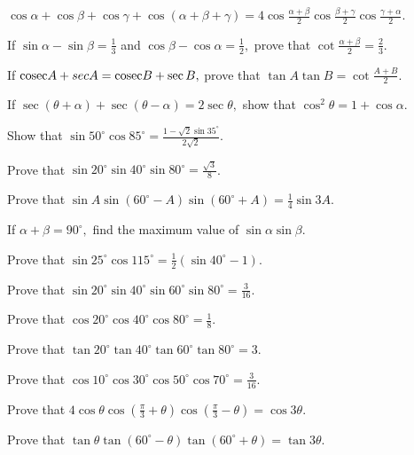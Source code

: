 \item $\cos\alpha + \cos\beta + \cos\gamma + \cos(\alpha + \beta + \gamma) = 4\cos\frac{\alpha + \beta}{2}\cos\frac{\beta +
    \gamma}{2}\cos \frac{\gamma + \alpha}{2}$.

\item If $\sin\alpha - \sin\beta = \frac{1}{3}$ and $\cos\beta - \cos\alpha = \frac{1}{2},$ prove that
    $\cot\frac{\alpha + \beta}{2} = \frac{2}{3}$.

\item If ${\rm cosec} A + sec A = {\rm cosec} B + \sec B,$ prove that $\tan A\tan B = \cot \frac{A + B}{2}$.

\item If $\sec(\theta + \alpha) + \sec(\theta - \alpha) = 2\sec\theta,$ show that $\cos^2\theta = 1 + \cos\alpha$.

\item Show that $\sin50^\circ\cos85^\circ = \frac{1 - \sqrt{2}\sin 35^\circ}{2\sqrt{2}}$.

\item Prove that $\sin 20^\circ \sin 40^\circ\sin 80^\circ = \frac{\sqrt{3}}{8}$.

\item Prove that $\sin A\sin(60^\circ - A)\sin(60^\circ + A) = \frac{1}{4}\sin 3A$.

\item If $\alpha + \beta = 90^\circ,$ find the maximum value of $\sin\alpha\sin\beta$.

\item Prove that $\sin 25^\circ\cos 115^\circ = \frac{1}{2}(\sin 40^\circ - 1)$.

\item Prove that $\sin 20^\circ \sin 40^\circ\sin 60^\circ \sin80^\circ = \frac{3}{16}$.

\item Prove that $\cos 20^\circ\cos40^\circ\cos80^\circ = \frac{1}{8}$.

\item Prove that $\tan20^\circ\tan40^\circ\tan60^\circ\tan80^\circ = 3$.

\item Prove that $\cos10^\circ\cos30^\circ\cos50^\circ\cos70^\circ = \frac{3}{16}$.

\item Prove that $4\cos\theta\cos\left(\frac{\pi}{3} + \theta\right)\cos\left(\frac{\pi}{3} - \theta\right) = \cos3\theta$.

\item Prove that $\tan\theta\tan(60^\circ - \theta)\tan(60^\circ + \theta) = \tan3\theta$.

